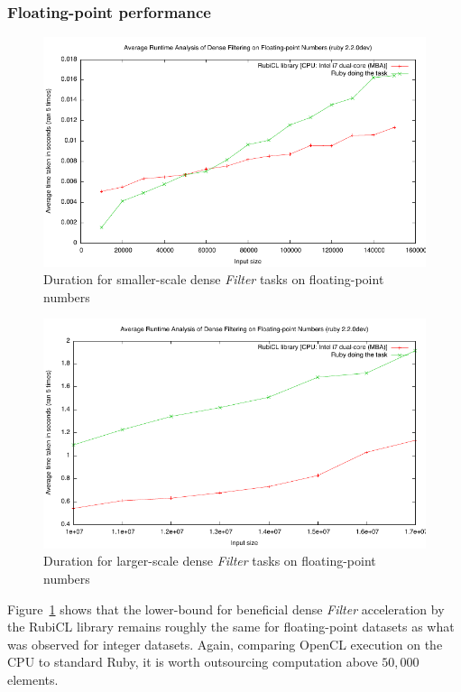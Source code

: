 \subsubsection{Floating-point performance}
\begin{figure}
  \includegraphics[width=\textwidth]{./graphing/ddensefilter.pdf}
  \caption{Duration for smaller-scale dense \emph{Filter} tasks on floating-point numbers}
  \label{fig:dddf_task_smallrun}
\end{figure}

\begin{figure}
  \includegraphics[width=\textwidth]{./graphing/ddfilterlots.pdf}
  \caption{Duration for larger-scale dense \emph{Filter} tasks on floating-point numbers}
  \label{fig:dddf_task_bigrun}
\end{figure}

Figure~\ref{fig:dddf_task_smallrun} shows that the lower-bound for beneficial dense \emph{Filter} acceleration by the RubiCL library remains roughly the same for floating-point datasets as what was observed for integer datasets. Again, comparing \ac{OpenCL} execution on the \ac{CPU} to standard Ruby, it is worth outsourcing computation above $50,000$ elements.

